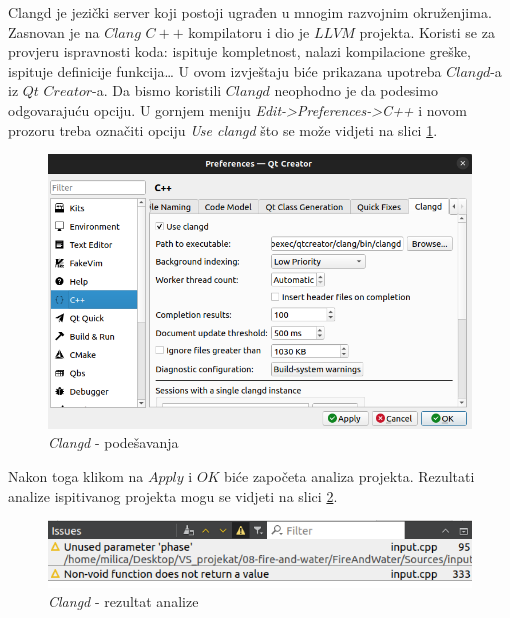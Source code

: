 \documentclass[a4paper]{article}
\begin{document}
	Clangd je jezički server koji postoji ugrađen u mnogim razvojnim okruženjima. Zasnovan je na $Clang$ $C++$ kompilatoru i dio je $LLVM$ projekta. Koristi se za provjeru ispravnosti koda: ispituje kompletnost, nalazi kompilacione greške, ispituje definicije funkcija… U ovom izvještaju biće prikazana upotreba $Clangd$-a iz $Qt$ $Creator$-a.
Da bismo koristili $Clangd$ neophodno je da podesimo odgovarajuću opciju. U gornjem meniju \textit{Edit->Preferences->C++} i novom prozoru treba označiti opciju \textit{Use clangd} što se može vidjeti na slici \ref{fig:c1}.
	 \begin{figure}[h!]
		\caption{\textit{Clangd} - podešavanja}
		\label{fig:c1}
		\includegraphics[scale=0.4]{../Clangd/c1.png}
	\end{figure}
	
Nakon toga klikom na $Apply$ i $OK$ biće započeta analiza projekta. Rezultati analize ispitivanog projekta mogu se vidjeti na slici \ref{fig:c2}.
	\begin{figure}[h!]
		\centering
		\caption{\textit{Clangd} - rezultat analize}
		\label{fig:c2}
		\includegraphics[scale=0.5]{../Clangd/c2.png}
	\end{figure}
	
\end{document}
